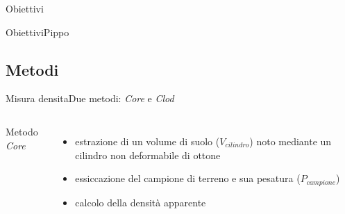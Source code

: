 \documentclass[10pt]{beamer}
\begin{document}
\begin{frame}{Obiettivi}
\begin{frame}{Obiettivi}{Pippo}
\subsection{Metodi}
\begin{frame}{Misura densita}{Due metodi: \emph{Core} e \emph{Clod}}
  \begin{columns}[c]
     Metodo \emph{Core}
    \pause
    \begin{itemize}[<+->] 
    \item estrazione di un volume di suolo ($V_{cilindro}$) noto mediante un cilindro
      non deformabile di ottone
      \pause
    \item essiccazione del campione di terreno e sua pesatura ($P_{campione}$)
    \item calcolo della densit\`a apparente
    \end{itemize}

\end{columns}
\end{frame}
\end{frame}
\end{frame}
\end{document}
